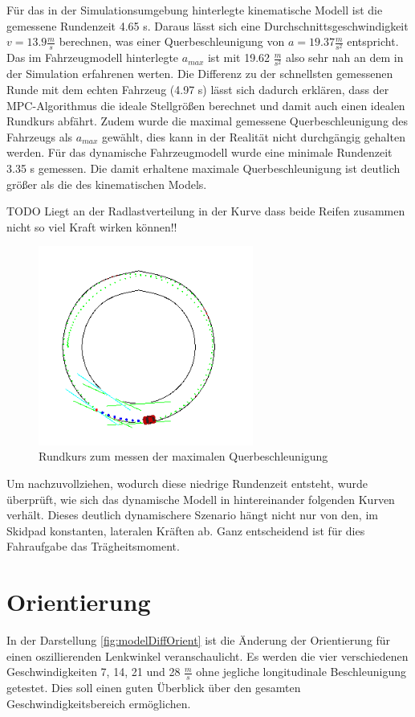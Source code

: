 \documentclass{like}
\begin{document}
Für das in der Simulationsumgebung hinterlegte kinematische Modell ist die gemessene Rundenzeit 4.65 s. Daraus lässt sich eine Durchschnittsgeschwindigkeit $ v= 13.9 \frac{m}{s}$ berechnen, was einer Querbeschleunigung von $a = 19.37 \frac{m}{s^2}$ entspricht. Das im Fahrzeugmodell hinterlegte $a_{max}$ ist mit 19.62 $ \frac{m}{s^2}$ also sehr nah an dem in der Simulation erfahrenen werten. Die Differenz zu der schnellsten gemessenen Runde mit dem echten Fahrzeug (4.97 s) lässt sich dadurch erklären, dass der MPC-Algorithmus die ideale Stellgrößen berechnet und damit auch einen idealen Rundkurs abfährt. Zudem wurde die maximal gemessene Querbeschleunigung des Fahrzeugs als $a_{max}$ gewählt, dies kann in der Realität nicht durchgängig gehalten werden.
Für das dynamische Fahrzeugmodell wurde eine minimale Rundenzeit 3.35 s gemessen.  Die damit erhaltene maximale Querbeschleunigung ist deutlich größer als die des kinematischen Models. 


TODO
Liegt an der Radlastverteilung in der Kurve dass beide Reifen zusammen nicht so viel Kraft wirken können!!


\begin{figure}
	\centering
	\includegraphics[width=200pt]{Abbildungen/roundCourse.png}
	\caption{Rundkurs zum messen der maximalen Querbeschleunigung}
	\label{fig:roundCourse}
\end{figure}

Um nachzuvollziehen, wodurch diese niedrige Rundenzeit entsteht, wurde überprüft, wie sich das dynamische Modell in hintereinander folgenden Kurven verhält.
Dieses deutlich dynamischere Szenario hängt nicht nur von den, im Skidpad konstanten, lateralen Kräften ab. Ganz entscheidend ist für dies Fahraufgabe das Trägheitsmoment.

\section{Orientierung}
In der Darstellung \ref{fig:modelDiffOrient} ist die Änderung der Orientierung für einen oszillierenden Lenkwinkel veranschaulicht. Es werden die vier verschiedenen Geschwindigkeiten 7, 14, 21 und 28 $\frac{m}{s}$ ohne jegliche longitudinale Beschleunigung getestet. Dies soll einen guten Überblick über den gesamten Geschwindigkeitsbereich ermöglichen.
\end{document}
